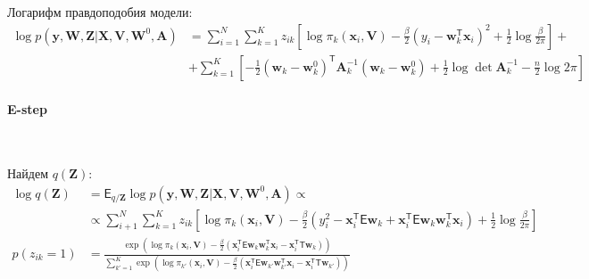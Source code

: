 \documentclass[12pt, twoside]{article}
\numberwithin{equation}{section}
\begin{document}
Логарифм правдоподобия модели:
\begin{equation}
\label{eq:st:lin:2}
\begin{aligned}
\log p\left(\textbf{y}, \textbf{W}, \textbf{Z}|\textbf{X}, \textbf{V}, \textbf{W}^{0}, \textbf{A}\right) &= \sum_{i=1}^{N}\sum_{k=1}^{K}z_{ik}\left[\log\pi_k\left(\textbf{x}_i, \textbf{V}\right) - \frac{\beta}{2}\left(y_{i} - \textbf{w}_{k}^{\mathsf{T}}\textbf{x}_{i}\right)^{2} + \frac{1}{2}\log\frac{\beta}{2\pi}\right] +\\
&+ \sum_{k=1}^{K}\left[-\frac{1}{2}\left(\textbf{w}_{k} - \textbf{w}_{k}^{0}\right)^{\mathsf{T}}\textbf{A}_{k}^{-1}\left(\textbf{w}_{k} - \textbf{w}_{k}^{0}\right) + \frac{1}{2}\log\det\textbf{A}^{-1}_{k} - \frac{n}{2}\log2\pi\right]
\end{aligned}
\end{equation}

\paragraph{E-step}~

Найдем $q\left(\textbf{Z}\right)$:
\begin{equation}
\label{eq:st:lin:3}
\begin{aligned}
\log q\left(\textbf{Z}\right) &= \mathsf{E}_{q/\textbf{Z}}\log p\left(\textbf{y}, \textbf{W}, \textbf{Z}|\textbf{X}, \textbf{V}, \textbf{W}^{0}, \textbf{A}\right)  \propto\\
&\propto \sum_{i+1}^{N}\sum_{k=1}^{K}z_{ik}\left[\log\pi_{k}\left(\textbf{x}_{i}, \textbf{V}\right) - \frac{\beta}{2}\left(y_{i}^{2} -\textbf{x}_{i}^{\mathsf{T}}\mathsf{E}\textbf{w}_{k} + \textbf{x}_{i}^{\mathsf{T}}\mathsf{E}\textbf{w}_{k}\textbf{w}_{k}^{\mathsf{T}}\textbf{x}_{i}\right) + \frac{1}{2}\log\frac{\beta}{2\pi}\right]\\
p\left(z_{ik} = 1\right) &= \frac{\exp\left(\log\pi_{k}\left(\textbf{x}_{i}, \textbf{V}\right) - \frac{\beta}{2}\left(\textbf{x}_{i}^{\mathsf{T}}\mathsf{E}\textbf{w}_{k}\textbf{w}_{k}^{\mathsf{T}}\textbf{x}_{i} - \textbf{x}_{i}^{\mathsf{T}}\mathsf{T}\textbf{w}_{k}\right)\right)}{\sum_{k'=1}^{K}\exp\left(\log\pi_{k'}\left(\textbf{x}_{i}, \textbf{V}\right) - \frac{\beta}{2}\left(\textbf{x}_{i}^{\mathsf{T}}\mathsf{E}\textbf{w}_{k'}\textbf{w}_{k'}^{\mathsf{T}}\textbf{x}_{i} - \textbf{x}_{i}^{\mathsf{T}}\mathsf{T}\textbf{w}_{k'}\right) \right)}
\end{aligned}
\end{equation}
\end{document}
